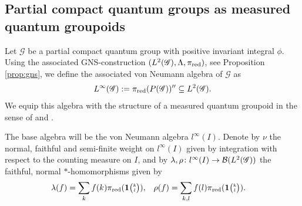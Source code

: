 \subsection{Partial compact quantum groups as measured quantum groupoids}

Let $\mathscr{G}$ be a partial compact quantum group with positive invariant integral $\phi$. Using the associated GNS-construction $(L^{2}(\mathscr{G}), \Lambda,\pi_{\operatorname{\mathrm{red}}})$, see Proposition \ref{prop:gns}, we define
the associated von Neumann algebra of $\mathscr{G}$ as
\begin{align*}
  L^{\infty}(\mathscr{G}) := \pi_{\operatorname{\mathrm{red}}}(P(\mathscr{G}))'' \subseteq L^{2}(\mathscr{G}).
\end{align*}
We equip this algebra with the structure of a measured quantum groupoid in the sense of \cite{Les1} and \cite{Eno2}. 

The base algebra will be the von Neumann algebra $l^{\infty}(I)$.
Denote by $\nu$ the normal, faithful and semi-finite weight on $l^{\infty}(I)$ given by
integration with respect to the counting measure on $I$, and by
$\lambda,\rho \colon l^{\infty}(I) \to  {\cal B}(L^{2}(\mathscr{G}))$
the faithful, normal $*$-homomorphisms given by
\begin{align*}
  \lambda(f)&= \sum_{k} f(k)\pi_{\operatorname{\mathrm{red}}}(\mathbf{1}{\tiny {\begin{pmatrix} k\\l\end{pmatrix}}}), &
 \rho(f) &= \sum_{k,l} f(l)\pi_{\operatorname{\mathrm{red}}}(\mathbf{1}{\tiny {\begin{pmatrix} k\\l\end{pmatrix}}}).
\end{align*}

